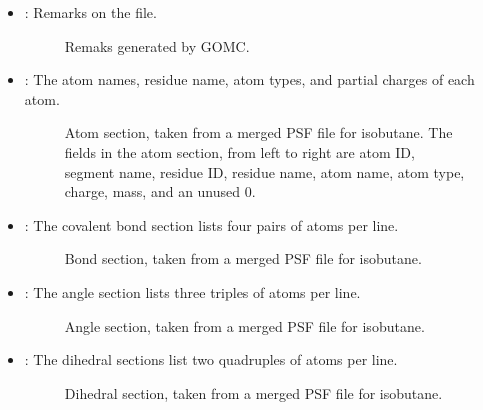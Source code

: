 \documentclass[letterpaper,10pt,english]{sphinxmanual}
\begin{document}
\begin{itemize}
\item {} 
\sphinxAtStartPar
{}: Remarks on the file.

\begin{figure}[htbp]
\centering
\capstart

\noindent{}
\caption{Remaks generated by GOMC.}\label{\detokenize{output_file:id10}}\end{figure}

\item {} 
\sphinxAtStartPar
{}: The atom names, residue name, atom types, and partial charges of each atom.

\begin{figure}[htbp]
\centering
\capstart

\noindent{}
\caption{Atom section, taken from a merged PSF file for isobutane. The fields in the atom section,
from left to right are atom ID, segment name, residue ID, residue name, atom name, atom type,
charge, mass, and an unused 0.}\label{\detokenize{output_file:id11}}\end{figure}

\item {} 
\sphinxAtStartPar
{}: The covalent bond section lists four pairs of atoms per line.

\begin{figure}[htbp]
\centering
\capstart

\noindent{}
\caption{Bond section, taken from a merged PSF file for isobutane.}\label{\detokenize{output_file:id12}}\end{figure}

\item {} 
\sphinxAtStartPar
{}: The angle section lists three triples of atoms per line.

\begin{figure}[htbp]
\centering
\capstart

\noindent{}
\caption{Angle section, taken from a merged PSF file for isobutane.}\label{\detokenize{output_file:id13}}\end{figure}

\item {} 
\sphinxAtStartPar
{}: The dihedral sections list two quadruples of atoms per line.

\begin{figure}[htbp]
\centering
\capstart

\noindent{}
\caption{Dihedral section, taken from a merged PSF file for isobutane.}\label{\detokenize{output_file:id14}}\end{figure}

\end{itemize}
\end{document}
